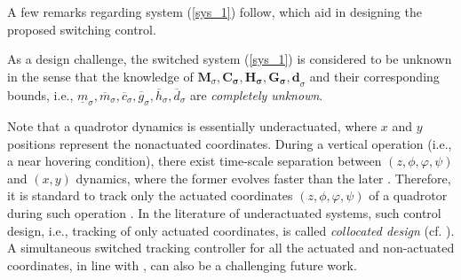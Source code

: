 \documentclass[AMA,STIX1COL,sort, compress]{WileyNJD-v2}
\begin{document}
A few remarks regarding system (\ref{sys_1}) follow, which aid in designing the proposed switching control. 
\begin{remark}[(Uncertainty)]
	As a design challenge, the switched system (\ref{sys_1}) is considered to be unknown in the sense that the knowledge of $\mathbf{M}_\sigma,\mathbf{C_\sigma,H_\sigma, G_\sigma, d}_{\sigma}$ and their corresponding bounds, i.e., $\underline{m}_{\sigma}, \overline{m}_{\sigma}, \overline c_{\sigma }, \overline g_{\sigma }, \overline h_{\sigma },\overline{d}_{\sigma}$ are \textit{completely unknown}. 
\end{remark}
\begin{remark}\label{remark_collocated}
	Note that a quadrotor dynamics is essentially underactuated, where $x$ and $y$ positions represent the nonactuated coordinates. During a vertical operation (i.e., a near hovering condition), there exist time-scale separation between $(z, \phi, \varphi, \psi)$ and $(x,y)$ dynamics, where the former evolves faster than the later \cite{dydek2012adaptive}. Therefore, it is standard to track only the actuated coordinates $(z, \phi, \varphi, \psi )$ of a quadrotor during such operation \cite{mofid2018adaptive, nicol2011robust}. In the literature of underactuated systems, such control design, i.e., tracking of only actuated coordinates, is called \textit{collocated design} (cf. \cite{shkolnik2008high,spong1994partial}). A simultaneous switched tracking controller for all the actuated and non-actuated coordinates, in line with \cite{roy2020towards}, can also be a challenging future work.
\end{remark}
\end{document}
